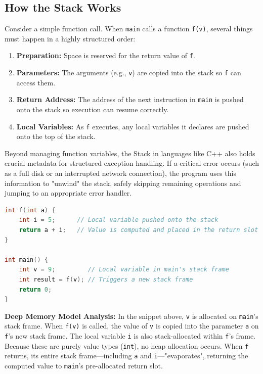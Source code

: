 \subsection{How the Stack Works}
Consider a simple function call. When \texttt{main} calls a function \texttt{f(v)}, several things must happen in a highly structured order:
\begin{enumerate}
    \item \textbf{Preparation:} Space is reserved for the return value of \texttt{f}.
    \item \textbf{Parameters:} The arguments (e.g., \texttt{v}) are copied into the stack so \texttt{f} can access them.
    \item \textbf{Return Address:} The address of the next instruction in \texttt{main} is pushed onto the stack so execution can resume correctly.
    \item \textbf{Local Variables:} As \texttt{f} executes, any local variables it declares are pushed onto the top of the stack.
\end{enumerate}

Beyond managing function variables, the Stack in languages like C++ also holds crucial metadata for structured exception handling. If a critical error occurs (such as a full disk or an interrupted network connection), the program uses this information to "unwind" the stack, safely skipping remaining operations and jumping to an appropriate error handler.

\begin{lstlisting}[language=C++]
int f(int a) {
    int i = 5;      // Local variable pushed onto the stack
    return a + i;   // Value is computed and placed in the return slot
}

int main() {
    int v = 9;         // Local variable in main's stack frame
    int result = f(v); // Triggers a new stack frame
    return 0;
}
\end{lstlisting}

\textbf{Deep Memory Model Analysis:}
In the snippet above, \texttt{v} is allocated on \texttt{main}'s stack frame. When \texttt{f(v)} is called, the value of \texttt{v} is copied into the parameter \texttt{a} on \texttt{f}'s new stack frame. The local variable \texttt{i} is also stack-allocated within \texttt{f}'s frame. Because these are purely value types (\texttt{int}), no heap allocation occurs. When \texttt{f} returns, its entire stack frame---including \texttt{a} and \texttt{i}---"evaporates", returning the computed value to \texttt{main}'s pre-allocated return slot.

